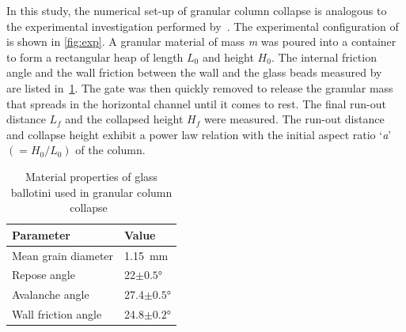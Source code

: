 In this study, the numerical set-up of granular column collapse is analogous to 
the  experimental investigation performed by~\citet{Lajeunesse2004}. The 
experimental configuration of~\citet{Lajeunesse2004} is shown in 
\cref{fig:exp}. A granular material of mass \textit{m} was poured into a 
container to form a rectangular heap of length ${L}_{0}$ and height 
${H}_{0}$. The internal friction angle and the wall friction between the wall 
and the glass beads measured by~\citet{Lajeunesse2004} are listed 
in~\cref{table:mat_prop}. The gate was then quickly removed to release the 
granular mass that spreads in the horizontal channel until it comes to rest. 
The final run-out distance ${L}_{{f}}$ and the collapsed height $H_{{f}}$ were 
measured. The run-out distance and collapse height exhibit a power law relation 
with the initial aspect ratio `\textit{a}' $(=H_{0}/L_{0})$ of the column. 

\begin{table}[tbhp]
\caption{Material properties of glass ballotini used in granular column 
collapse~\citep{Lajeunesse2004}}
\label{table:mat_prop}
\centering
\begin{tabular}{ll}
\toprule
\textbf{Parameter} & \textbf{Value} \\ \midrule
Mean grain diameter & 1.15~\si{\mm} \\
Repose angle & 22$\pm 0.5$\si{\degree} \\
Avalanche angle & 27.4$\pm 0.5$\si{\degree} \\
Wall friction angle & 24.8$\pm 0.2$\si{\degree}\\
\bottomrule
\end{tabular}
\end{table}


